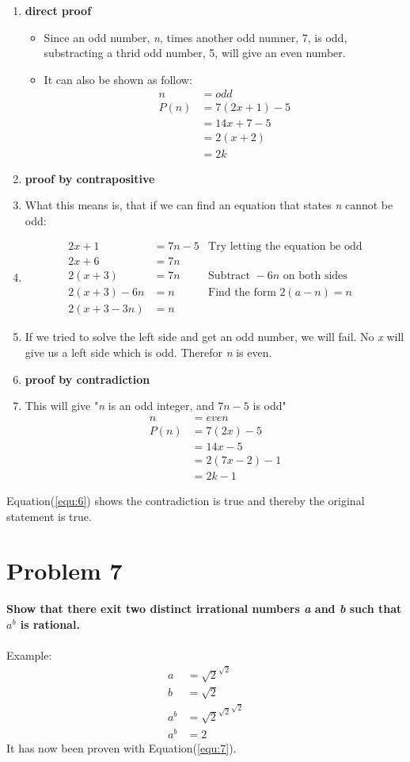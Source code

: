 \documentclass[english,10pt,a4paper]{article}
\begin{document}
\begin{enumerate}[a]
\item \textbf{direct proof}
\begin{itemize}
\item  Since an odd number, \textit{n}, times another odd numner, 7, is odd, substracting a thrid odd number, 5, will give an even number.
\item It can also be shown as follow:
\begin{align}
n&=odd\\
P(n)&=7(2x+1)-5\\
	&=14x+7-5\\
	&=2(x+2)\\
	&=2k
\end{align}
\end{itemize}
\item \textbf{proof by contrapositive}
\item[] What this means is, that if we can find an equation that states \textit{n} cannot be odd:
\item[]
\begin{align}
2x+1 &= 7 n-5 & \text{Try letting the equation be odd}\\
2x+6 &= 7n\\
2(x+3)&=7n & \text{Subtract }-6n \text{ on both sides}\\
2(x+3)-6n &= n &\text{Find the form } 2(a-n) = n\\
2(x+3-3n) &= n
\end{align}
\item[] If we tried to solve the left side and get an odd number, we will fail.
No \textit{x} will give us a left side which is odd.
Therefor \textit{n} is even.
\item \textbf{proof by contradiction}
\item[] This will give "\textit{n} is an odd integer, and $7n-5$ is odd"
\begin{align}
n&=even\\
P(n)&=7(2x)-5\\
	&=14x-5\\
	&=2(7x-2)-1\\
	&=2k-1 \label{equ:6}
\end{align}
\end{enumerate}
Equation(\ref{equ:6}) shows the contradiction is true and thereby the original statement is true.


\section*{Problem 7}
\textbf{Show that there exit two distinct irrational numbers \textit{a} and \textit{b} such that $a^b$ is rational.}
\\
\\
Example: 
\begin{align}
a &= \sqrt{2}^{\sqrt{2}}\\
b &= \sqrt{2}\\
a^b &= {\sqrt{2}^{\sqrt{2}}}^{\sqrt{2}}\\
a^b &= 2 \label{equ:7}
\end{align}
It has now been proven with Equation(\ref{equ:7}).
\end{document}
